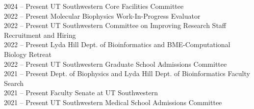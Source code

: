 2024 -- Present \hspace{14pt} UT Southwestern Core Facilities Committee \\
2022 -- Present \hspace{14pt} Molecular Biophysics Work-In-Progress Evaluator \\
2022 -- Present \hspace{14pt} UT Southwestern Committee on Improving Research Staff Recruitment and Hiring \\
2022 -- Present \hspace{14pt} Lyda Hill Dept. of Bioinformatics and BME-Computational Biology Retreat \\
2022 -- Present \hspace{14pt} UT Southwestern Graduate School Admissions Committee \\
2021 -- Present \hspace{14pt} Dept. of Biophysics and Lyda Hill Dept. of Bioinformatics Faculty Search \\
2021 -- Present \hspace{14pt} Faculty Senate at UT Southwestern \\
2021 -- Present \hspace{14pt} UT Southwestern Medical School Admissions Committee \\
\\
